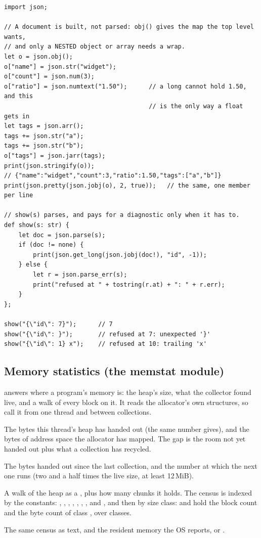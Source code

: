 \begin{lstlisting}
import json;

// A document is built, not parsed: obj() gives the map the top level wants,
// and only a NESTED object or array needs a wrap.
let o = json.obj();
o["name"] = json.str("widget");
o["count"] = json.num(3);
o["ratio"] = json.numtext("1.50");      // a long cannot hold 1.50, and this
                                        // is the only way a float gets in
let tags = json.arr();
tags += json.str("a");
tags += json.str("b");
o["tags"] = json.jarr(tags);
print(json.stringify(o));
// {"name":"widget","count":3,"ratio":1.50,"tags":["a","b"]}
print(json.pretty(json.jobj(o), 2, true));   // the same, one member per line

// show(s) parses, and pays for a diagnostic only when it has to.
def show(s: str) {
    let doc = json.parse(s);
    if (doc != none) {
        print(json.get_long(json.jobj(doc!), "id", -1));
    } else {
        let r = json.parse_err(s);
        print("refused at " + tostring(r.at) + ": " + r.err);
    }
};

show("{\"id\": 7}");      // 7
show("{\"id\": }");       // refused at 7: unexpected '}'
show("{\"id\": 1} x");    // refused at 10: trailing 'x'
\end{lstlisting}
\subsection{Memory statistics (the memstat module)}
\label{sec:builtin-memstat}

 answers where a program's memory is: the heap's size,
what the collector found live, and a walk of every block on it. It reads the
allocator's own structures, so call it from one thread and between collections.

\begin{description}[style=nextline,leftmargin=5.2em]
\item[\ic{memstat.used()}, \ic{memstat.mapped()}] The bytes this thread's heap
  has handed out (the same number  gives), and the bytes of
  address space the allocator has mapped. The gap is the room not yet handed
  out plus what a collection has recycled.
\item[\ic{memstat.since\_gc()}, \ic{memstat.gc\_trigger()}] The bytes handed
  out since the last collection, and the number at which the next one runs
  (two and a half times the live size, at least 12\,MiB).
\item[\ic{memstat.census()}, \ic{memstat.chunk\_count()}] A walk of the heap as
  a \ic{[long]}, plus how many chunks it holds. The census is indexed by the
   constants: , ,
  , , ,
  , ,  and
  , and then by size class:
   and  hold the block count and the byte
  count of class , over  classes.
\item[\ic{memstat.report()}] The same census as text, and
   the resident memory the OS reports, or .
\end{description}

